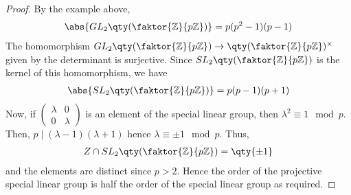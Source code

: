 \begin{proof}
	By the example above,
	\begin{align*}
		\abs{GL_2\qty(\faktor{\mathbb Z}{p\mathbb Z})} = p(p^2 - 1)(p - 1)
	\end{align*}
	The homomorphism $GL_2\qty(\faktor{\mathbb Z}{p\mathbb Z}) \to \qty(\faktor{\mathbb Z}{p\mathbb Z})^\times$ given by the determinant is surjective.
	Since $SL_2\qty(\faktor{\mathbb Z}{p\mathbb Z})$ is the kernel of this homomorphism, we have
	\begin{align*}
		\abs{SL_2\qty(\faktor{\mathbb Z}{p\mathbb Z})} = p(p-1)(p+1)
	\end{align*}
	Now, if \(
	\begin{pmatrix}
		\lambda & 0 \\ 0 & \lambda
	\end{pmatrix}
	\) is an element of the special linear group, then $\lambda^2 \equiv 1 \mod p$.
	Then, $p \mid (\lambda - 1)(\lambda + 1)$ hence $\lambda \equiv \pm 1 \mod p$.
	Thus,
	\begin{align*}
		Z \cap SL_2\qty(\faktor{\mathbb Z}{p\mathbb Z}) = \qty{\pm 1}
	\end{align*}
	and the elements are distinct since $p > 2$.
	Hence the order of the projective special linear group is half the order of the special linear group as required.
\end{proof}
